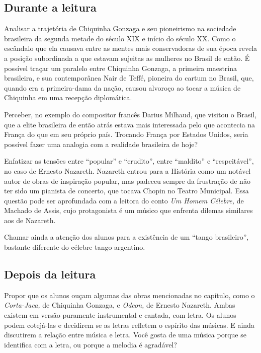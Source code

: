 \documentclass[11pt]{extarticle}
\begin{document}
\subsection{Durante a leitura}

Analisar a trajetória de Chiquinha Gonzaga e seu pioneirismo na
sociedade brasileira da segunda metade do século XIX e início do século
XX. Como o escândalo que ela causava entre as mentes mais conservadoras
de sua época revela a posição subordinada a que estavam sujeitas as
mulheres no Brasil de então. É possível traçar um paralelo entre
Chiquinha Gonzaga, a primeira maestrina brasileira, e sua contemporânea
Nair de Teffé, pioneira do cartum no Brasil, que, quando era a
primeira-dama da nação, causou alvoroço ao tocar a música de Chiquinha
em uma recepção diplomática.

Perceber, no exemplo do compositor francês Darius Milhaud, que visitou o
Brasil, que a elite brasileira de então atrás estava mais interessada
pelo que acontecia na França do que em seu próprio país. Trocando França
por Estados Unidos, seria possível fazer uma analogia com a realidade
brasileira de hoje?

Enfatizar as tensões entre ``popular'' e ``erudito'', entre ``maldito''
e ``respeitável'', no caso de Ernesto Nazareth. Nazareth entrou para a
História como um notável autor de obras de inspiração popular, mas
padeceu sempre da frustração de não ter sido um pianista de concerto,
que tocava Chopin no Teatro Municipal. Essa questão pode ser aprofundada
com a leitora do conto \emph{Um Homem Célebre,} de Machado de Assis,
cujo protagonista é um músico que enfrenta dilemas similares aos de
Nazareth.

Chamar ainda a atenção dos alunos para a existência de um ``tango
brasileiro'', bastante diferente do célebre tango argentino.

\subsection{Depois da leitura}

Propor que os alunos ouçam algumas das obras mencionadas no capítulo,
como o \emph{Corta-Jaca,} de Chiquinha Gonzaga, e \emph{Odeon,} de
Ernesto Nazareth. Ambas existem em versão puramente instrumental e
cantada, com letra. Os alunos podem cotejá-las e decidirem se as letras
refletem o espírito das músicas. E ainda discutirem a relação entre
música e letra. Você gosta de uma música porque se identifica com a
letra, ou porque a melodia é agradável?
\end{document}
